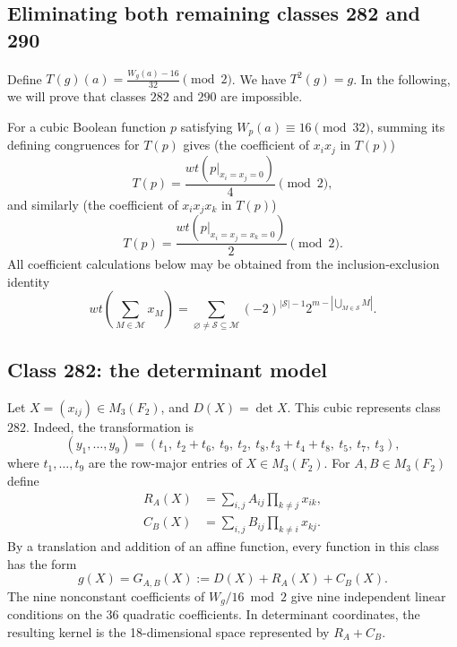 \documentclass[11pt]{article}
\newtheorem{open problem}{Open problem}
\begin{document}
\begin{appendix}
\section{Eliminating both remaining classes 282 and 290}
Define $T(g)(a)=\frac{W_g(a)-16}{32}\pmod2$. We have $T^2(g)=g$.
In the following, we will prove that classes $282$ and $290$ are impossible.

For a cubic Boolean function $p$ satisfying $W_p(a)\equiv16\pmod{32}$,  summing
its defining congruences for $T(p)$ gives  (the coefficient of $x_ix_j$ in $T(p)$)
\begin{equation}
[x_ix_j]T(p)=
\frac{wt(p|_{x_i=x_j=0})}{4}\pmod2,
\label{eq:quadratic-coeff}
\end{equation}
and similarly  (the coefficient of $x_ix_jx_k$ in $T(p)$)
\begin{equation}
[x_ix_jx_k]T(p)=
\frac{wt(p|_{x_i=x_j=x_k=0})}{2}\pmod2.
\label{eq:cubic-coeff}
\end{equation}
All coefficient calculations below may be obtained from the inclusion-exclusion
identity
\begin{equation}
wt\left(\sum_{M\in\mathcal M}x_M\right)
=
\sum_{\varnothing\ne\mathcal S\subseteq\mathcal M}
(-2)^{|\mathcal S|-1}
2^{m-\left|\bigcup_{M\in\mathcal S}M\right|}.
\label{eq:weight-formula}
\end{equation}

\subsection{Class 282: the determinant model}

Let $X=(x_{ij})\in M_3(F_2)$,
and $D(X)=\det X$.
This cubic represents class $282$. Indeed, the transformation is
\[
(y_1,\ldots,y_9)=(  t_1,\ t_2+t_6,\ t_9,\ t_2,\ t_8,
t_3+t_4+t_8,\ t_5,\ t_7,\ t_3),
\]
where $t_1,\ldots,t_9$ are the row-major entries of $X\in M_3(F_2)$.
For $A,B\in M_3(F_2)$ define
\begin{align}
R_A(X)&=\sum_{i,j}A_{ij}\prod_{k\ne j}x_{ik},\\
C_B(X)&=\sum_{i,j}B_{ij}\prod_{k\ne i}x_{kj}.
\end{align}
By a translation and addition of an affine function, every function in this class has the form
\begin{equation}
g(X)=G_{A,B}(X):=D(X)+R_A(X)+C_B(X).
\label{eq:det-normal-form}
\end{equation}
The nine nonconstant coefficients of $W_g/16\bmod2$ give nine independent
linear conditions on the 36 quadratic coefficients. In determinant coordinates,
the resulting kernel is the 18-dimensional space represented by $R_A+C_B$.


\end{appendix}
\end{document}
